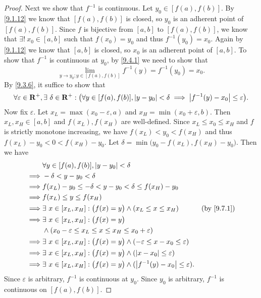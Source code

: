 \begin{proof}
  Next we show that \(f^{-1}\) is continuous.
  Let \(y_0 \in [f(a), f(b)]\).
  By \cref{9.1.12} we know that \([f(a), f(b)]\) is closed, so \(y_0\) is an adherent point of \([f(a), f(b)]\).
  Since \(f\) is bijective from \([a, b]\) to \([f(a), f(b)]\), we know that \(\exists!\ x_0 \in [a, b]\) such that \(f(x_0) = y_0\) and thus \(f^{-1}(y_0) = x_0\).
  Again by \cref{9.1.12} we know that \([a, b]\) is closed, so \(x_0\) is an adherent point of \([a, b]\).
  To show that \(f^{-1}\) is continuous at \(y_0\), by \cref{9.4.1} we need to show that
  \[
    \lim_{y \to y_0 ; y \in [f(a), f(b)]} f^{-1}(y) = f^{-1}(y_0) = x_0.
  \]
  By \cref{9.3.6}, it suffice to show that
  \[
    \forall \varepsilon \in \mathbf{R}^+, \exists\ \delta \in \mathbf{R}^+ : \big(\forall y \in [f(a), f(b)], \left\lvert y - y_0\right\rvert < \delta \implies \left\lvert f^{-1}(y) - x_0\right\rvert \leq \varepsilon\big).
  \]
  Now fix \(\varepsilon\).
  Let \(x_L = \max(x_0 - \varepsilon, a)\) and \(x_H = \min(x_0 + \varepsilon, b)\).
  Then \(x_L, x_H \in [a, b]\) and \(f(x_L), f(x_H)\) are well-defined.
  Since \(x_L \leq x_0 \leq x_H\) and \(f\) is strictly monotone increasing, we have \(f(x_L) < y_0 < f(x_H)\) and thus \(f(x_L) - y_0 < 0 < f(x_H) - y_0\).
  Let \(\delta = \min\big(y_0 - f(x_L), f(x_H) - y_0\big)\).
  Then we have
  \begin{align*}
             & \forall y \in [f(a), f(b)], \abs{y - y_0} < \delta                                                                           \\
    \implies & -\delta < y - y_0 < \delta                                                                                                   \\
    \implies & f(x_L) - y_0 \leq -\delta < y - y_0 < \delta \leq f(x_H) - y_0                                                               \\
    \implies & f(x_L) \leq y \leq f(x_H)                                                                                                    \\
    \implies & \exists\ x \in [x_L, x_H] : \big(f(x) = y\big) \land (x_L \leq x \leq x_H)                        & \text{(by \cref{9.7.1})} \\
    \implies & \exists\ x \in [x_L, x_H] : \big(f(x) = y\big)                                                                               \\
             & \land (x_0 - \varepsilon \leq x_L \leq x \leq x_H \leq x_0 + \varepsilon)                                                    \\
    \implies & \exists\ x \in [x_L, x_H] : \big(f(x) = y\big) \land (-\varepsilon \leq x - x_0 \leq \varepsilon)                            \\
    \implies & \exists\ x \in [x_L, x_H] : \big(f(x) = y\big) \land (\abs{x - x_0} \leq \varepsilon)                                        \\
    \implies & \exists\ x \in [x_L, x_H] : \big(f(x) = y\big) \land (\abs{f^{-1}(y) - x_0} \leq \varepsilon).
  \end{align*}
  Since \(\varepsilon\) is arbitrary, \(f^{-1}\) is continuous at \(y_0\).
  Since \(y_0\) is arbitrary, \(f^{-1}\) is continuous on \([f(a), f(b)]\).


\end{proof}
